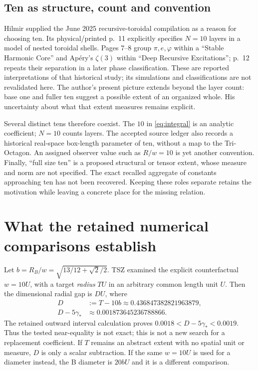 \documentclass[11pt,a4paper]{article}
\newcommand{\ph}{\varphi}\newcommand{\Li}{\operatorname{Li}}\newcommand{\conv}{\operatorname{conv}}
\begin{document}
\subsection{Ten as structure, count and convention}
Hilmir supplied the June 2025 recursive-toroidal compilation as a reason for choosing ten. Its physical/printed p.~11 explicitly specifies $N=10$ layers in a model of nested toroidal shells. Pages 7--8 group $\pi,e,\ph$ within a ``Stable Harmonic Core'' and Ap\'ery's $\zeta(3)$ within ``Deep Recursive Excitations''; p.~12 repeats their separation in a later phase classification. These are reported interpretations of that historical study; its simulations and classifications are not revalidated here. The author's present picture extends beyond the layer count: base one and fuller ten suggest a possible extent of an organized whole. His uncertainty about what that extent measures remains explicit.~\cite{Toroidal,Intent}

Several distinct tens therefore coexist. The $10$ in \eqref{eq:integral} is an analytic coefficient; $N=10$ counts layers. The accepted source ledger also records a historical real-space box-length parameter of ten, without a map to the Tri-Octagon. An assigned observer value such as $R/w=10$ is yet another convention. Finally, ``full size ten'' is a proposed structural or tensor extent, whose measure and norm are not specified. The exact recalled aggregate of constants approaching ten has not been recovered. Keeping these roles separate retains the motivation while leaving a concrete place for the missing relation.~\cite[Sec.~14; App.~E]{SP}~\cite{Intent,TSZReview}

\section{What the retained numerical comparisons establish}
Let $b=R_B/w=\sqrt{13/12+\sqrt2/2}$. TSZ examined the explicit counterfactual $w=10U$, with a target \emph{radius} $TU$ in an arbitrary common length unit $U$. Then the dimensional radial gap is $DU$, where
\begin{align}
D&:=T-10b\approx0.436847382821963879,\label{eq:D}\\
D-5\gamma_*&\approx0.001873645236788866 .\label{eq:mismatch}
\end{align}
The retained outward interval calculation proves $0.0018<D-5\gamma_*<0.0019$. Thus the tested near-equality is not exact; this is not a new search for a replacement coefficient. If $T$ remains an abstract extent with no spatial unit or measure, $D$ is only a scalar subtraction. If the same $w=10U$ is used for a diameter instead, the B diameter is $20bU$ and it is a different comparison.~\cite{TSZZeta,TSZReview}
\end{document}
